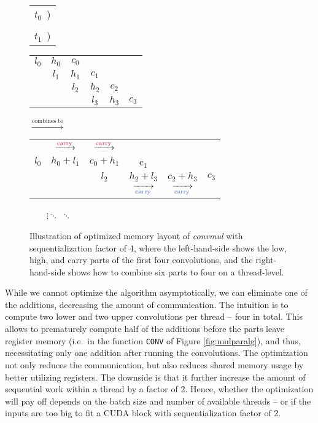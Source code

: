 \begin{figure}
  \begin{center}
  \small
  \begin{tabular}{C{0.5cm}}
  \Large{\color{Crimson} $t_0$}~)\\\\
    \Large{\color{RoyalBlue} $t_1$}~)
\end{tabular}
  \begin{tabular}{cccccc}
    \color{Crimson}$l_0$ & \color{Crimson}$h_0$ & \color{Crimson}$c_0$ & & & \\
    & \color{Crimson}$l_1$ & \color{Crimson}$h_1$ & \color{Crimson}$c_1$ & & \\
    & & \color{RoyalBlue}$l_2$ & \color{RoyalBlue}$h_2$ & \color{RoyalBlue}$c_2$ & \\
    & & & \color{RoyalBlue}$l_3$ & \color{RoyalBlue}$h_3$ & \color{RoyalBlue}$c_3$
  \end{tabular}
$\xrightarrow{\text{combines to}}$
\begin{tabular}{cccccc}
     & $\xrightarrow{\scriptsize \text{\color{Crimson}carry}}$ & $\xrightarrow{\scriptsize \text{\color{Crimson}carry}}$ &  &  &  \\
    \color{Crimson}$l_0$ & \color{Crimson}$h_0 + l_1$ & \color{Crimson}$c_0 + h_1$ & \color{Crimson}c$_1$ & & \\
    & & \color{RoyalBlue}$l_2$ & \color{RoyalBlue}$h_2+l_3$ & \color{RoyalBlue}$c_2+h_3$ & \color{RoyalBlue} $c_3$\\
  & & & $\xrightarrow[\scriptsize \text{\color{RoyalBlue}carry}]{}$ & $\xrightarrow[\scriptsize \text{\color{RoyalBlue}carry}]{}$ & \\
\end{tabular}
\end{center}
~~~~$\vdots$\qquad\qquad\qquad\qquad\qquad $\ddots$ \qquad\qquad\qquad\qquad\qquad\qquad\qquad\qquad\qquad\qquad\qquad\qquad  $\ddots$
\caption{\footnotesize Illustration of optimized memory layout of
  \textit{convmul} with sequentialization factor of 4, where the left-hand-side
  shows the low, high, and carry parts of the first four convolutions, and the
  right-hand-side shows how to combine six parts to four on a thread-level.}
  \label{fig:muloptmem}
\end{figure}

While we cannot optimize the algorithm asymptotically, we can eliminate one
of the additions, decreasing the amount of communication. The intuition is to
compute two lower and two upper convolutions per thread -- four in total. This
allows to prematurely compute half of the additions before the parts leave
register memory (i.e.\ in the function \texttt{CONV} of Figure
\ref{fig:mulparalg}), and thus, necessitating only one addition after running
the convolutions. The optimization not only reduces the communication, but also
reduces shared memory usage by better utilizing registers. The downside is that
it further increase the amount of sequential work within a thread by a factor of
2. Hence, whether the optimization will pay off depends on the batch size and
number of available threads -- or if the inputs are too big to fit a CUDA block
with sequentialization factor of 2.

